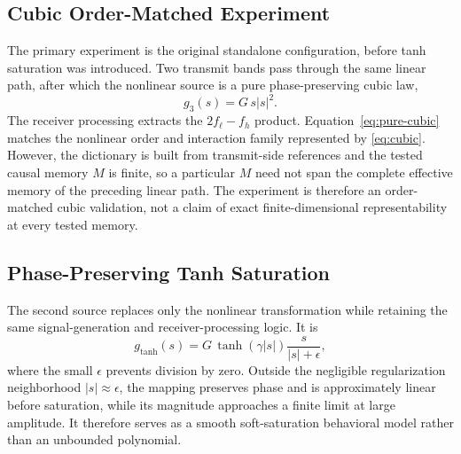 \documentclass[conference]{IEEEtran}
\begin{document}
\subsection{Cubic Order-Matched Experiment}
The primary experiment is the original standalone configuration, before tanh saturation was introduced. Two transmit bands pass through the same linear path, after which the nonlinear source is a pure phase-preserving cubic law,
\begin{equation}
 g_3(s)=G\,s|s|^2.
 \label{eq:pure-cubic}
\end{equation}
The receiver processing extracts the $2f_{\ell}-f_h$ product. Equation~\eqref{eq:pure-cubic} matches the nonlinear order and interaction family represented by \eqref{eq:cubic}. However, the dictionary is built from transmit-side references and the tested causal memory $M$ is finite, so a particular $M$ need not span the complete effective memory of the preceding linear path. The experiment is therefore an order-matched cubic validation, not a claim of exact finite-dimensional representability at every tested memory.

\subsection{Phase-Preserving Tanh Saturation}
The second source replaces only the nonlinear transformation while retaining the same signal-generation and receiver-processing logic. It is
\begin{equation}
 g_{\tanh}(s)=G\,\tanh(\gamma|s|)\frac{s}{|s|+\epsilon},
 \label{eq:tanh}
\end{equation}
where the small $\epsilon$ prevents division by zero. Outside the negligible regularization neighborhood $|s|\approx\epsilon$, the mapping preserves phase and is approximately linear before saturation, while its magnitude approaches a finite limit at large amplitude. It therefore serves as a smooth soft-saturation behavioral model rather than an unbounded polynomial.
\end{document}
